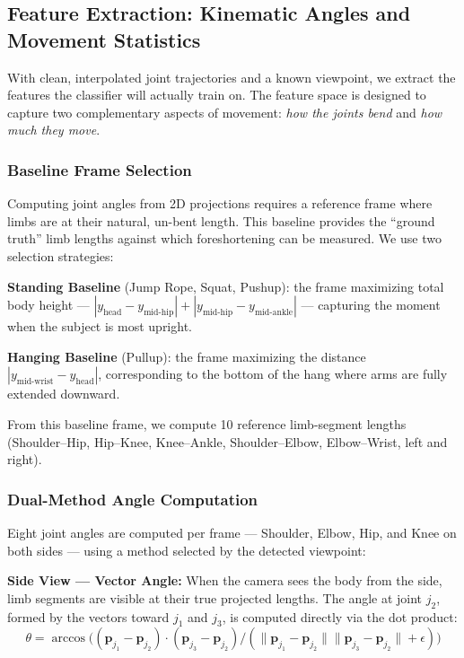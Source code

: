 \documentclass[10pt, twocolumn, a4paper]{article}
\begin{document}
\subsection{Feature Extraction: Kinematic Angles and Movement Statistics}
With clean, interpolated joint trajectories and a known viewpoint, we extract the features the classifier will actually train on. The feature space is designed to capture two complementary aspects of movement: \textit{how the joints bend} and \textit{how much they move}.

\subsubsection{Baseline Frame Selection}
Computing joint angles from 2D projections requires a reference frame where limbs are at their natural, un-bent length. This baseline provides the ``ground truth'' limb lengths against which foreshortening can be measured. We use two selection strategies:

\textbf{Standing Baseline} (Jump Rope, Squat, Pushup): the frame maximizing total body height — $|y_{\text{head}} - y_{\text{mid-hip}}| + |y_{\text{mid-hip}} - y_{\text{mid-ankle}}|$ — capturing the moment when the subject is most upright.

\textbf{Hanging Baseline} (Pullup): the frame maximizing the distance $|y_{\text{mid-wrist}} - y_{\text{head}}|$, corresponding to the bottom of the hang where arms are fully extended downward.

From this baseline frame, we compute 10 reference limb-segment lengths (Shoulder--Hip, Hip--Knee, Knee--Ankle, Shoulder--Elbow, Elbow--Wrist, left and right).

\subsubsection{Dual-Method Angle Computation}
Eight joint angles are computed per frame — Shoulder, Elbow, Hip, and Knee on both sides — using a method selected by the detected viewpoint:

\textbf{Side View --- Vector Angle:} When the camera sees the body from the side, limb segments are visible at their true projected lengths. The angle at joint $j_2$, formed by the vectors toward $j_1$ and $j_3$, is computed directly via the dot product:
\begin{equation}
\theta = \arccos\!\bigl( (\mathbf{p}_{j_1} - \mathbf{p}_{j_2}) \cdot (\mathbf{p}_{j_3} - \mathbf{p}_{j_2}) / (\|\mathbf{p}_{j_1} - \mathbf{p}_{j_2}\| \|\mathbf{p}_{j_3} - \mathbf{p}_{j_2}\| + \epsilon) \bigr)
\end{equation}
\end{document}

